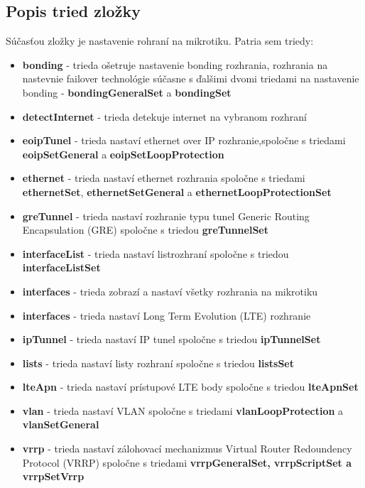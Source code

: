\subsection{Popis tried zložky}
Súčasťou zložky je nastavenie rohraní na mikrotiku. Patria sem triedy:
\begin{itemize}
\item \textbf{bonding} - trieda ošetruje nastavenie bonding rozhrania, rozhrania na nastevnie failover technológie súčasne s ďalšimi dvomi triedami na nastavenie bonding - \textbf{bondingGeneralSet} a \textbf{bondingSet} 
\item \textbf{detectInternet} - trieda detekuje internet na vybranom rozhraní
\item \textbf{eoipTunel} - trieda nastaví ethernet over IP rozhranie,spoločne s triedami \textbf{eoipSetGeneral} a \textbf{eoipSetLoopProtection}
\item \textbf{ethernet} - trieda nastaví ethernet rozhrania spoločne s triedami \textbf{ethernetSet}, \textbf{ethernetSetGeneral} a \textbf{ethernetLoopProtectionSet}
\item \textbf{greTunnel} - trieda nastaví rozhranie typu tunel Generic Routing Encapsulation (GRE) spoločne s triedou \textbf{greTunnelSet}
\item \textbf{interfaceList} - trieda nastaví listrozhraní spoločne s triedou \textbf{interfaceListSet}
\item \textbf{interfaces} - trieda zobrazí  a nastaví všetky rozhrania na mikrotiku
\item \textbf{interfaces} - trieda nastaví Long Term Evolution (LTE) rozhranie
\item \textbf{ipTunnel} - trieda nastaví IP tunel spoločne s triedou \textbf{ipTunnelSet}
\item \textbf{lists} - trieda nastaví listy rozhraní spoločne s triedou \textbf{listsSet}
\item \textbf{lteApn} - trieda nastaví prístupové LTE body spoločne s triedou \textbf{lteApnSet}
\item \textbf{vlan} - trieda nastaví VLAN spoločne s triedami \textbf{vlanLoopProtection} a \textbf{vlanSetGeneral}
\item \textbf{vrrp} - trieda nastaví zálohovací mechanizmus  Virtual Router Redoundency Protocol (VRRP) spoločne s triedami \textbf{vrrpGeneralSet, vrrpScriptSet a vrrpSetVrrp}
\end{itemize}
